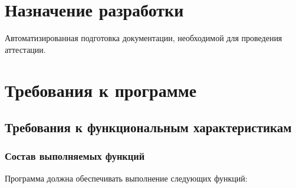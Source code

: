 \documentclass[14pt]{extarticle}        %
\begin{document}
\newpage

\section{Назначение разработки}
Автоматизированная подготовка документации, необходимой для проведения аттестации.

\newpage

\section{Требования к программе}
\subsection{Требования к функциональным характеристикам}
\subsubsection{Состав выполняемых функций}
Программа должна обеспечивать выполнение следующих функций:\par
\end{document}
